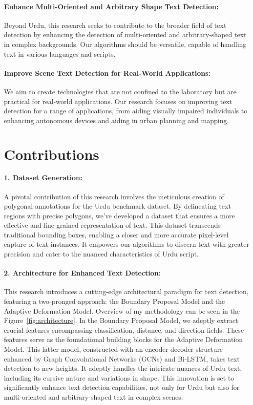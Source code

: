 \paragraph{Enhance Multi-Oriented and Arbitrary Shape Text Detection:} \hfill \break
Beyond Urdu, this research seeks to contribute to the broader field of text detection by enhancing the detection of multi-oriented and arbitrary-shaped text in complex backgrounds. Our algorithms should be versatile, capable of handling text in various languages and scripts.

\paragraph{Improve Scene Text Detection for Real-World Applications:} \hfill \break
We aim to create technologies that are not confined to the laboratory but are practical for real-world applications. Our research focuses on improving text detection for a range of applications, from aiding visually impaired individuals to enhancing autonomous devices and aiding in urban planning and mapping.

\section{Contributions}
\paragraph{1. Dataset Generation:} \hfill \break
A pivotal contribution of this research involves the meticulous creation of polygonal annotations for the Urdu benchmark dataset. By delineating text regions with precise polygons, we've developed a dataset that ensures a more effective and fine-grained representation of text. This dataset transcends traditional bounding boxes, enabling a closer and more accurate pixel-level capture of text instances. It empowers our algorithms to discern text with greater precision and cater to the nuanced characteristics of Urdu script.

\paragraph{2. Architecture for Enhanced Text Detection:} \hfill \break This research introduces a cutting-edge architectural paradigm for text detection, featuring a two-pronged approach: the Boundary Proposal Model and the Adaptive Deformation Model. Overview of my methodology can be seen in the Figure~\ref{fig:architecture}. In the Boundary Proposal Model, we adeptly extract crucial features encompassing classification, distance, and direction fields. These features serve as the foundational building blocks for the Adaptive Deformation Model. This latter model, constructed with an encoder-decoder structure enhanced by Graph Convolutional Networks (GCNs) and Bi-LSTM, takes text detection to new heights. It adeptly handles the intricate nuances of Urdu text, including its cursive nature and variations in shape. This innovation is set to significantly enhance text detection capabilities, not only for Urdu but also for multi-oriented and arbitrary-shaped text in complex scenes.

